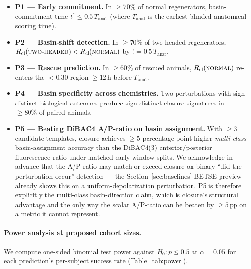 \documentclass[11pt,a4paper]{article}
\begin{document}
\begin{itemize}\itemsep0pt
\item \textbf{P1 --- Early commitment.} In $\geq 70\%$ of normal regenerators, basin-commitment time $t^{*}\leq 0.5\,T_{\mathrm{anat}}$ (where $T_{\mathrm{anat}}$ is the earliest blinded anatomical scoring time).
\item \textbf{P2 --- Basin-shift detection.} In $\geq 70\%$ of two-headed regenerators, $R_{\mathrm{cl}}(\textsc{two-headed})<R_{\mathrm{cl}}(\textsc{normal})$ by $t=0.5\,T_{\mathrm{anat}}$.
\item \textbf{P3 --- Rescue prediction.} In $\geq 60\%$ of rescued animals, $R_{\mathrm{cl}}(\textsc{normal})$ re-enters the $<0.30$ region $\geq 12$\,h before $T_{\mathrm{anat}}$.
\item \textbf{P4 --- Basin specificity across chemistries.} Two perturbations with sign-distinct biological outcomes produce sign-distinct closure signatures in $\geq 80\%$ of paired animals.
\item \textbf{P5 --- Beating DiBAC4 A/P-ratio on basin assignment.} With $\geq 3$ candidate templates, closure achieves $\geq 5$ percentage-point higher \emph{multi-class} basin-assignment accuracy than the DiBAC4(3) anterior/posterior fluorescence ratio under matched early-window splits. We acknowledge in advance that the A/P-ratio may match or exceed closure on binary ``did the perturbation occur'' detection --- the Section~\ref{sec:baselines} BETSE preview already shows this on a uniform-depolarization perturbation. P5 is therefore explicitly the multi-class basin-direction claim, which is closure's structural advantage and the only way the scalar A/P-ratio can be beaten by $\geq 5$\,pp on a metric it cannot represent.
\end{itemize}

\paragraph{Power analysis at proposed cohort sizes.}
We compute one-sided binomial test power against $H_{0}: p\leq 0.5$ at $\alpha=0.05$ for each prediction's per-subject success rate (Table~\ref{tab:power}).
\end{document}
